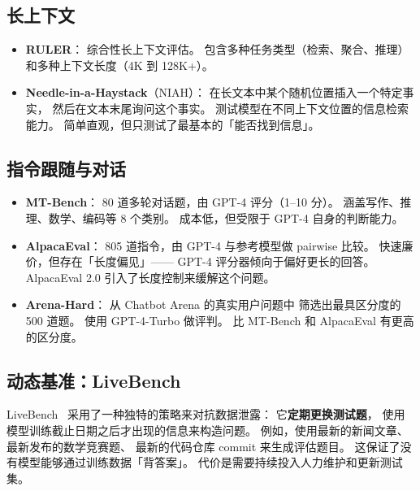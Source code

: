 \subsection{长上下文}
\begin{itemize}[noitemsep]
  \item \textbf{RULER}：
        综合性长上下文评估。
        包含多种任务类型（检索、聚合、推理）
        和多种上下文长度（4K 到 128K+）。
  \item \textbf{Needle-in-a-Haystack}（NIAH）：
        在长文本中某个随机位置插入一个特定事实，
        然后在文本末尾询问这个事实。
        测试模型在不同上下文位置的信息检索能力。
        简单直观，但只测试了最基本的「能否找到信息」。
\end{itemize}

\subsection{指令跟随与对话}
\begin{itemize}[noitemsep]
  \item \textbf{MT-Bench}：
        80 道多轮对话题，由 GPT-4 评分（1--10 分）。
        涵盖写作、推理、数学、编码等 8 个类别。
        成本低，但受限于 GPT-4 自身的判断能力。
  \item \textbf{AlpacaEval}：
        805 道指令，由 GPT-4 与参考模型做 pairwise 比较。
        快速廉价，但存在「长度偏见」——
        GPT-4 评分器倾向于偏好更长的回答。
        AlpacaEval 2.0 引入了长度控制来缓解这个问题。
  \item \textbf{Arena-Hard}：
        从 Chatbot Arena 的真实用户问题中
        筛选出最具区分度的 500 道题。
        使用 GPT-4-Turbo 做评判。
        比 MT-Bench 和 AlpacaEval 有更高的区分度。
\end{itemize}

\subsection{动态基准：LiveBench}

\begin{keybox}
LiveBench~\cite{white2024livebench} 采用了一种独特的策略来对抗数据泄露：
它\textbf{定期更换测试题}，
使用模型训练截止日期之后才出现的信息来构造问题。
例如，使用最新的新闻文章、最新发布的数学竞赛题、
最新的代码仓库 commit 来生成评估题目。
这保证了没有模型能够通过训练数据「背答案」。
代价是需要持续投入人力维护和更新测试集。
\end{keybox}


